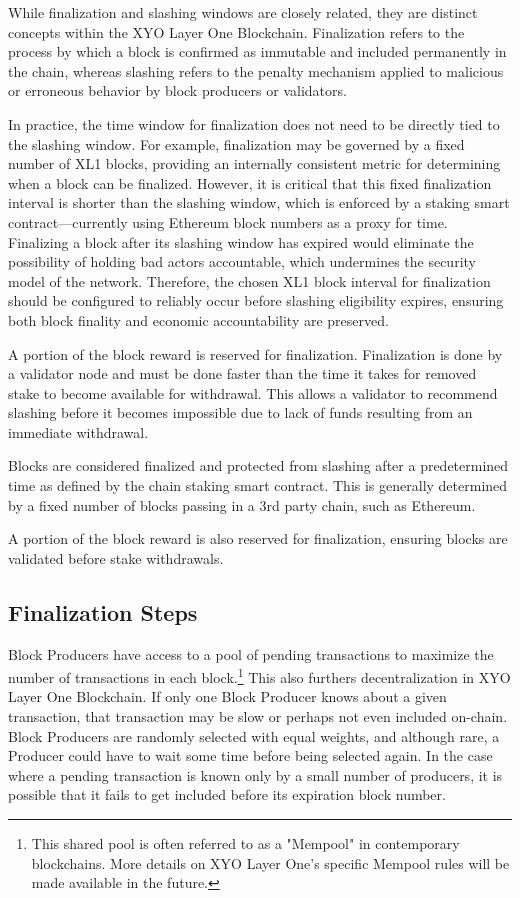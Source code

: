 \documentclass{article}
\begin{document}
While finalization and slashing windows are closely related, they are distinct concepts within the XYO Layer One Blockchain. Finalization refers to the process by which a block is confirmed as immutable and included permanently in the chain, whereas slashing refers to the penalty mechanism applied to malicious or erroneous behavior by block producers or validators.

In practice, the time window for finalization does not need to be directly tied to the slashing window. For example, finalization may be governed by a fixed number of XL1 blocks, providing an internally consistent metric for determining when a block can be finalized. However, it is critical that this fixed finalization interval is shorter than the slashing window, which is enforced by a staking smart contract—currently using Ethereum block numbers as a proxy for time. Finalizing a block after its slashing window has expired would eliminate the possibility of holding bad actors accountable, which undermines the security model of the network. Therefore, the chosen XL1 block interval for finalization should be configured to reliably occur before slashing eligibility expires, ensuring both block finality and economic accountability are preserved.

A portion of the block reward is reserved for finalization. Finalization is done by a validator node and must be done faster than the time it takes for removed stake to become available for withdrawal. This allows a validator to recommend slashing before it becomes impossible due to lack of funds resulting from an immediate withdrawal. 

Blocks are considered finalized and protected from slashing after a predetermined time as defined by the chain staking smart contract. This is generally determined by a fixed number of blocks passing in a 3rd party chain, such as Ethereum.

A portion of the block reward is also reserved for finalization, ensuring blocks are validated before stake withdrawals. 


\subsection{Finalization Steps}
Block Producers have access to a pool of pending transactions to maximize the number of transactions in each block.\footnote{This shared pool is often referred to as a "Mempool" in contemporary blockchains. More details on XYO Layer One's specific Mempool rules will be made available in the future.} This also furthers decentralization in XYO Layer One Blockchain. If only one Block Producer knows about a given transaction, that transaction may be slow or perhaps not even included on-chain. Block Producers are randomly selected with equal weights, and although rare, a Producer could have to wait some time before being selected again. In the case where a pending transaction is known only by a small number of producers, it is possible that it fails to get included before its expiration block number.
\end{document}
